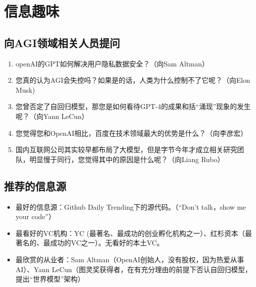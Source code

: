 \section{信息趣味}
\subsection{向AGI领域相关人员提问}
\begin{enumerate}
    \item openAI的GPT如何解决用户隐私数据安全？（向Sam Altman）
    \item 您真的认为AGI会失控吗？如果是的话，人类为什么控制不了它呢？（向Elon Musk)
    \item 您曾否定了自回归模型，那您是如何看待GPT-4的成果和括“涌现”现象的发生呢？（向Yann LeCun）
    \item 您觉得您和OpenAI相比，百度在技术领域最大的优势是什么？（向李彦宏）
    \item 国内互联网公司其实较早都布局了大模型，但是字节今年才成立相关研究团队，明显慢于同行，您觉得其中的原因是什么呢？（向Liang Rubo）
\end{enumerate}

\subsection{推荐的信息源}
\begin{itemize}
    \item 最好的信息源：Github Daily Trending下的源代码。（“Don’t talk，show me your code”）
    \item 最看好的VC机构：YC (最著名、最成功的创业孵化机构之一）、红杉资本（最著名的、最成功的VC之一）。无看好的本土VC。
    \item 最欣赏的从业者：Sam Altman（OpenAI创始人，没有股权，因为热爱从事AI）、Yann LeCun（图灵奖获得者，在有充分理由的前提下否认自回归模型，提出“世界模型”架构）
\end{itemize}